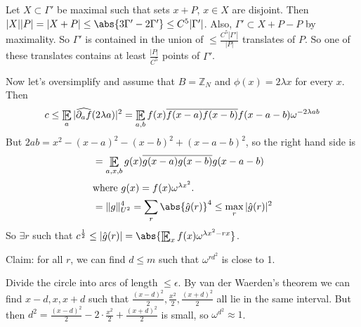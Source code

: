 \documentclass{article}
\DeclareMathOperator*{\E}{\scalerel*{\mathbb{E}}{\textstyle\sum}}
\newcommand{\1}[1]{\mathbbm{1}_{#1}}
\begin{document}
Let $X \subset \Gamma'$ be maximal such that sets $x+P$, $x \in X$ are disjoint.
Then $|X| |P| = |X+P| \leq \abs{3\Gamma' - 2 \Gamma'} \leq C^5 |\Gamma'|$.
Also, $\Gamma' \subset X + P - P$ by maximality.
So $\Gamma'$ is contained in the union of $\leq \frac{C^5 |\Gamma'|}{|P|}$ translates of $P$.
So one of these translates contains at least $\frac{|P|}{C^5}$ points of $\Gamma'$.

Now let's oversimplify and assume that $B = \mathbb{Z}_N$ and $\phi(x) = 2 \lambda x$ for every $x$.
Then
\begin{align*}
  c \leq \E_a |\widehat{\partial_a f} (2 \lambda a)|^2 = \E_{a,b} f(x) \overline{f(x-a)} \overline{f(x-b)} f(x-a-b) \omega^{-2\lambda a b }
\end{align*}
But $2ab = x^2 - (x-a)^2 - (x-b)^2 + (x-a-b)^2$, so the right hand side is
\begin{align*}
  &= \E_{a,x,b} g(x) \overline{g(x-a)} \overline{g(x-b)} g(x-a-b) \\
  \shortintertext{where $g(x) = f(x) \omega^{\lambda x^2}$.}
  &= \|g\|_{U^2}^4 = \sum_r \abs{\hat{g}(r)}^4 \leq \max_r |\hat{g}(r)|^2
\end{align*}
So $\exists r$ such that $c^\frac{1}{2} \leq |\hat{g}(r)| = \abs{\E_x f(x) \omega^{\lambda x^2 - r x}}$.

Claim: for all $r$, we can find $d \leq m$ such that $\omega^{r d^2}$ is close to 1.

Divide the circle into arcs of length $\leq \epsilon$. By van der Waerden's theorem we can find $x-d, x, x+d$ such that $\frac{(x-d)^2}{2}, \frac{x^2}{2}, \frac{(x+d)^2}{2}$ all lie in the same interval.
But then $d^2 = \frac{(x-d)^2}{2} - 2 \cdot \frac{x^2}{2} + \frac{(x+d)^2}{2}$ is small, so $\omega^{d^2} \approx 1$.
\end{document}
